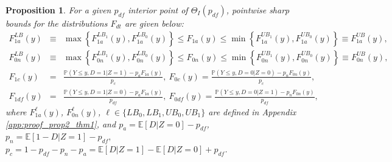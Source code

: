 \documentclass[12pt]{article}
\theoremstyle{plain}
\newtheorem{proposition}{Proposition}%
\theoremstyle{definition}
\theoremstyle{remark}
\begin{document}
\begin{proposition}\label{prop:distbound}
For a given $p_{df}$ interior point of $\Theta_I(p_{df})$, pointwise sharp bounds for the distributions $F_{dt}$ are given below:
\begin{eqnarray*}
    F_{1a}^{LB}(y)&\equiv& \max\left\{F_{1a}^{LB_1}(y),F_{1a}^{LB_0}(y)\right\} \leq F_{1a}(y) \leq \min\left\{F_{1a}^{UB_1}(y),F_{1a}^{UB_0}(y)\right\}\equiv F_{1a}^{UB}(y),\\
    F_{0n}^{LB}(y) &\equiv& \max\left\{F_{0n}^{LB_1}(y),F_{0n}^{LB_0}(y)\right\} \leq F_{0n}(y) \leq \min\left\{F_{0n}^{UB_1}(y),F_{0n}^{UB_0}(y)\right\}\equiv F_{0n}^{UB}(y),\\
    F_{1c}(y) &=& \frac{\mathbb P(Y \leq y, D=1 \vert Z=1)-p_a F_{1a}(y)}{p_c },\ F_{0c}(y) = \frac{\mathbb P(Y \leq y, D=0 \vert Z=0)-p_n F_{0n}(y)}{p_c },\\
    F_{1df}(y) &=& \frac{\mathbb P(Y \leq y, D=1 \vert Z=0)-p_a F_{1a}(y)}{p_{df} },\ F_{0df}(y) = \frac{\mathbb P(Y \leq y, D=0 \vert Z=1)-p_n F_{0n}(y)}{p_{df}},%
\end{eqnarray*}
where $F_{1a}^{\ell}(y)$, $F_{0n}^{\ell}(y)$, $\ell \in \{LB_0, LB_1, UB_0, UB_1\}$ are defined in Appendix \ref{app:proof_prop2_thm1}, 
and $p_a=\mathbb{E}[D  \vert  Z=0]-p_{d f}$, $p_n= \mathbb{E}[1-D  \vert  Z=1]-p_{d f},$ $p_c=1-p_{df}-p_n-p_a=\mathbb{E}[D  \vert  Z=1] - \mathbb{E}[D  \vert  Z=0] +p_{df}$.

    

\end{proposition}
\end{document}
